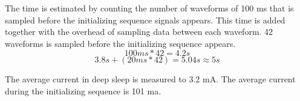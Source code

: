 The time is estimated by counting the number of waveforms of 100 ms that is sampled before the initializing sequence signals appears. This time is added together with the overhead of sampling data between each waveform. 42 waveforms is sampled before the initializing sequence appears. 
\begin{equation}
100 ms * 42 = 4.2 s
\end{equation}
\begin{equation}
3.8 s + (20ms*42) = 5.04 s \approx  5 s
\end{equation}

The average current in deep sleep is measured to 3.2 mA. The average current during the initializing sequence is 101 ma. 







\newpage